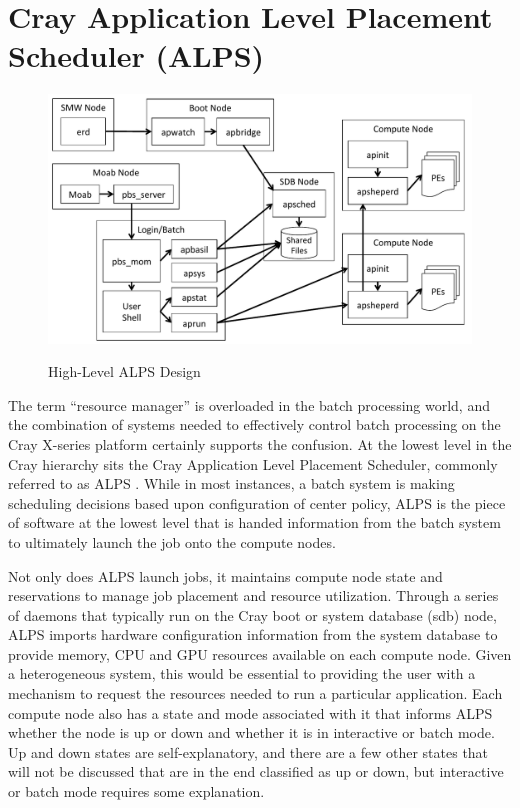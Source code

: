 \section{Cray Application Level Placement Scheduler (ALPS)}

\begin{figure}
  \centering
  \includegraphics[width=6.5in]{figures/alps-hilevel.pdf}\\
  \caption{High-Level ALPS Design}\label{fig:alps-hilevel}
\end{figure}

The term ``resource manager'' is overloaded in the batch processing world, and
the combination of systems needed to effectively control batch processing on
the Cray X-series platform certainly supports the confusion.  At the lowest
level in the Cray hierarchy sits the Cray Application Level Placement Scheduler,
commonly referred to as ALPS \cite{alps}.  While in most instances, a batch
system is making scheduling decisions based upon configuration of center
policy, ALPS is the piece of software at the lowest level that is handed
information from the batch system to ultimately launch the job onto the compute
nodes.

Not only does ALPS launch jobs, it maintains compute node state and
reservations to manage job placement and resource utilization.  Through a
series of daemons that typically run on the Cray boot or system database (sdb)
node, ALPS imports hardware configuration information from the system database
to provide memory, CPU and GPU resources available on each compute node.  Given
a heterogeneous system, this would be essential to providing the user with a
mechanism to request the resources needed to run a particular application.
Each compute node also has a state and mode associated with it that informs
ALPS whether the node is up or down and whether it is in interactive or batch
mode.  Up and down states are self-explanatory, and there are a few other
states that will not be discussed that are in the end classified as up or down,
but interactive or batch mode requires some explanation.  

